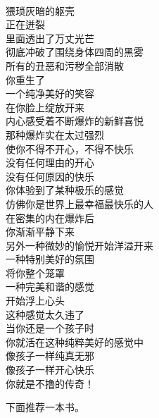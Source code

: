 \begin{poem}[不撸的传奇]
    \begin{multicols}{2}
        \begin{center}~\\
            猥琐灰暗的躯壳 \\ 正在迸裂 \\ 里面透出了万丈光芒 \\ 彻底冲破了围绕身体四周的黑雾 \\ 所有的丑恶和污秽全部消散 \\ 你重生了 \\ 一个纯净美好的笑容 \\ 在你脸上绽放开来 \\ 内心感受着不断爆炸的新鲜喜悦 \\ 那种爆炸实在太过强烈 \\ 使你不得不开心，不得不快乐 \\ 没有任何理由的开心 \\ 没有任何原因的快乐 \\ 你体验到了某种极乐的感觉 \\ 仿佛你是世界上最幸福最快乐的人 \\ 在密集的内在爆炸后 \\ 你渐渐平静下来 \\ 另外一种微妙的愉悦开始洋溢开来 \\ 一种特别美好的氛围 \\ 将你整个笼罩 \\ 一种完美和谐的感觉 \\ 开始浮上心头 \\ 这种感觉太久违了 \\ 当你还是一个孩子时 \\ 你就活在这种纯粹美好的感觉中 \\ 像孩子一样纯真无邪 \\ 像孩子一样开心快乐 \\ 你就是不撸的传奇！
        \end{center}
    \end{multicols}
\end{poem}

下面推荐一本书。

